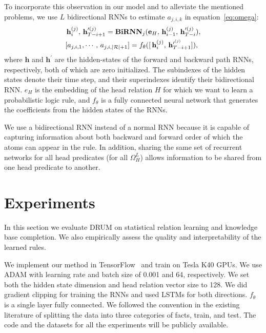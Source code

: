 \documentclass{article}
\newcommand{\mb}[1]{\mathbf{#1}}
\begin{document}
To incorporate this observation in our model and to alleviate the mentioned problems, we use $L$ bidirectional RNNs to estimate $a_{j,i,k}$ in equation~\ref{eq:omega}:
\begin{align} 
    &\mkern3mu \mb{h}^{(j)}_{i},\mkern3mu \mb{h}^{\prime(j)}_{T-i+1} =\mb{BiRNN}_j(\mb{e}_H,\mkern3mu \mb{h}^{(j)}_{i-1},\mkern3mu \mb{h}^{\prime(j)}_{T-i}), 
    \\ 
    &[a_{j,i,1},\cdots,\mkern3mu  a_{j,i, |\mathcal{R}|+1}] =      f_{\mb{\theta}}([\mkern3mu \mb{h}^{(j)}_{i},\mkern3mu \mb{h}^{\prime^{(j)}}_{T-i+1}]),
\end{align}
where $\mb{h}$ and $\mb{h}^\prime$ are the hidden-states of the forward and backward path RNNs, respectively, both of which are zero initialized. The subindexes of the hidden states denote their time step, and their superindexes identify their bidirectional RNN. $e_H$ is the embedding of the head relation $H$ for which we want to learn a probabilistic logic rule, and $f_{\theta}$ is a fully connected neural network that generates the coefficients from the hidden states of the RNNs.

We use a bidirectional RNN instead of a normal RNN because it is capable of capturing information about both backward and forward order of which the atoms can appear in the rule. In addition, sharing the same set of recurrent networks for all head predicates (for all $\Omega^L_H$) allows information to be shared from one head predicate to another.

\section{Experiments}
\label{sec:experiments}

In this section we evaluate DRUM on statistical relation learning and knowledge base completion. We also empirically assess the quality and interpretability of the learned rules.

We implement our method in TensorFlow~\cite{tensorflow2015-whitepaper} and train on Tesla K40 GPUs. We use ADAM \cite{kingma2014adam} with learning rate and batch size of 0.001 and 64, respectively. We set both the hidden state dimension and head relation vector size to 128. We did gradient clipping for training the RNNs and used LSTMs \cite{hochreiter1997long} for both directions. $f_{\theta}$ is a single layer fully connected. We followed the convention in the existing literature \citep{yang2017differentiable} of splitting the data into three categories of facts, train, and test. The code and the datasets for all the experiments will be publicly available.
\end{document}
